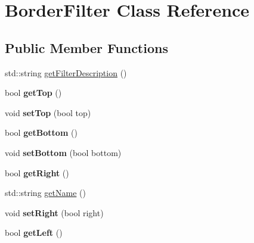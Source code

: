 \hypertarget{classFilter_1_1BorderFilter}{}\section{Border\+Filter Class Reference}
\label{classFilter_1_1BorderFilter}
\subsection*{Public Member Functions}
\begin{DoxyCompactItemize}
\item 
std\+::string \hyperlink{classFilter_1_1BorderFilter_a2b3f7d8fcd3d774b4a2fde5914a9729f}{get\+Filter\+Description} ()
\item 
\hypertarget{classFilter_1_1BorderFilter_a7f662ce666098754b0916a828633f842}{}bool {\bfseries get\+Top} ()\label{classFilter_1_1BorderFilter_a7f662ce666098754b0916a828633f842}

\item 
\hypertarget{classFilter_1_1BorderFilter_a41a3d0253d877ec681fc30f85ae21aed}{}void {\bfseries set\+Top} (bool top)\label{classFilter_1_1BorderFilter_a41a3d0253d877ec681fc30f85ae21aed}

\item 
\hypertarget{classFilter_1_1BorderFilter_ac96fcca335b0daaa5e216993666a7af2}{}bool {\bfseries get\+Bottom} ()\label{classFilter_1_1BorderFilter_ac96fcca335b0daaa5e216993666a7af2}

\item 
\hypertarget{classFilter_1_1BorderFilter_ae60a4cf24fcd4cc34ca831917a609e79}{}void {\bfseries set\+Bottom} (bool bottom)\label{classFilter_1_1BorderFilter_ae60a4cf24fcd4cc34ca831917a609e79}

\item 
\hypertarget{classFilter_1_1BorderFilter_a09836b29d544b94e145dd6a725887dd2}{}bool {\bfseries get\+Right} ()\label{classFilter_1_1BorderFilter_a09836b29d544b94e145dd6a725887dd2}

\item 
std\+::string \hyperlink{classFilter_1_1BorderFilter_ac0fc966d4386ddb71d99361e3fccb311}{get\+Name} ()
\item 
\hypertarget{classFilter_1_1BorderFilter_a18165f5951ddba8f3b25b2a199f90bc1}{}void {\bfseries set\+Right} (bool right)\label{classFilter_1_1BorderFilter_a18165f5951ddba8f3b25b2a199f90bc1}

\item 
\hypertarget{classFilter_1_1BorderFilter_afb561071d09e3b031b1d951c51e94f24}{}bool {\bfseries get\+Left} ()\label{classFilter_1_1BorderFilter_afb561071d09e3b031b1d951c51e94f24}


\end{DoxyCompactItemize}
